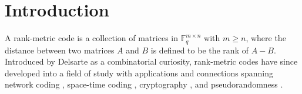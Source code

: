 \documentclass[11pt]{article}
\newif\ifmynotes
\newcommand{\ZGnote}[1]{\ifmynotes\textcolor{purple}{[Zeyu: #1]}\else\fi}
\newcommand{\ZZnote}[1]{\ifmynotes\textcolor{violet}{[Zihan: #1]}\else\fi}
\theoremstyle{plain}
\theoremstyle{definition}
\theoremstyle{remark}
\newcommand{\F}{\mathbb{F}}
\begin{document}
\begin{abstract}
\end{abstract}
\newpage
\tableofcontents
\thispagestyle{empty}
\newpage
\setcounter{page}{1}
\section{Introduction}
A rank-metric code is a collection of matrices in $\F_q^{m\times n}$ with $m \geq n$, where the distance between two matrices $A$ and $B$ is defined to be the rank of $A-B$.
Introduced by Delsarte \cite{Del} as a combinatorial curiosity, rank-metric codes have since developed into a field of study with applications and connections spanning network coding \cite{KK07,SKK08,kK08,SK09}, space-time coding \cite{LGB03, LK05}, cryptography \cite{Gib96,Gib95,Loi10,Loi17}, and pseudorandomness \cite{FS12,FG15,GWX16,GRX21,GVJZ23}.
\end{document}
